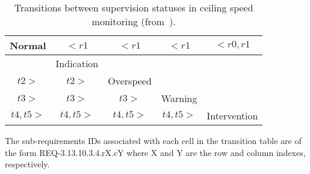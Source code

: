 \begin{table}
\caption{Transitions between supervision statuses in ceiling speed
  monitoring (from~\cite[Table~7]{ETCSSRS-Principles}).}
\begin{center}
\begin{tabular}{|c|c|c|c|c|}
\hline\hline
\hspace {1em}Normal  &\hspace{1em} $< r1$ & \hspace{1em}$< r1$ &\hspace{1em} $< r1$ & $< r0,r1$
\\\hline
\hspace {1em} & \hspace{1em} Indication  & & & 
 \\\hline
\hspace {1em} $t2 >$ &\hspace {1em} $t2 > $ &\hspace{1em} Overspeed  & & 
 \\\hline
\hspace {1em} $t3 >$ & \hspace {1em} $t3 >$ & \hspace{1em} $t3 >$ &\hspace{1em} Warning  &
 \\\hline
\hspace {1em} $t4,t5 >$ & \hspace {1em} $t4,t5 >$ & \hspace{1em}$t4,t5 >$ & \hspace{1em}$t4,t5 >$ &\hspace{1em} Intervention
\\\hline\hline
\end{tabular}
\end{center}


\smallskip
 The
  sub-requirements IDs associated with each cell in the transition table
   are of the form  REQ-3.13.10.3.4.rX.cY where X and Y
  are the row and   column indexes, respectively. 
\normalsize
\label{tab:seven}
\end{table}%
